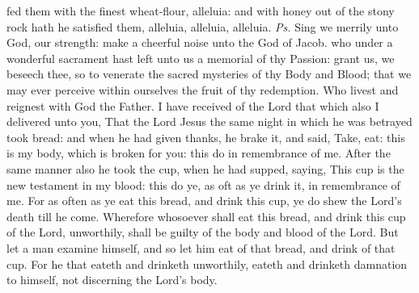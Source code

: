\introit
{} fed them with the finest wheat-flour, alleluia: and with honey out of the stony rock hath he satisfied them, alleluia, alleluia, alleluia. \textit{Ps.} Sing we merrily unto God, our strength: make a cheerful noise unto the God of Jacob.
\collect
{} who under a wonderful sacrament hast left unto us a memorial of thy Passion: grant us, we beseech thee, so to venerate the sacred mysteries of thy Body and Blood; that we may ever perceive within ourselves the fruit of thy redemption. Who livest and reignest with God the Father.
 I have received of the Lord that which also I delivered unto you, That the Lord Jesus the same night in which he was betrayed took bread: and when he had given thanks, he brake it, and said, Take, eat: this is my body, which is broken for you: this do in remembrance of me. After the same manner also he took the cup, when he had supped, saying, This cup is the new testament in my blood: this do ye, as oft as ye drink it, in remembrance of me. For as often as ye eat this bread, and drink this cup, ye do shew the Lord's death till he come. Wherefore whosoever shall eat this bread, and drink this cup of the Lord, unworthily, shall be guilty of the body and blood of the Lord. But let a man examine himself, and so let him eat of that bread, and drink of that cup. For he that eateth and drinketh unworthily, eateth and drinketh damnation to himself, not discerning the Lord's body.



